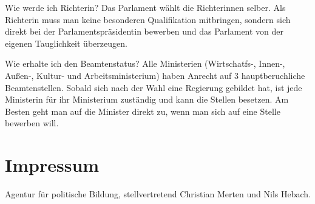 \documentclass{sasbase}
\begin{document}
\begin{question}{Wie werde ich Richterin?}
	Das Parlament w\"{a}hlt die Richterinnen selber. Als Richterin muss man keine besonderen Qualifikation mitbringen, sondern sich direkt bei der Parlamentspr\"{a}sidentin bewerben und das Parlament von der eigenen Tauglichkeit \"{u}berzeugen.
\end{question}

\begin{question}{Wie erhalte ich den Beamtenstatus?}
	Alle Ministerien (Wirtschatfs-, Innen-, Au{\ss}en-, Kultur- und Arbeitsministerium) haben Anrecht auf 3 hauptberuchliche Beamtenstellen. Sobald sich nach der Wahl eine Regierung gebildet hat, ist jede Ministerin f\"{u}r ihr Ministerium zust\"{a}ndig und kann die Stellen besetzen. Am Besten geht man auf die Minister direkt zu, wenn man sich auf eine Stelle bewerben will.
\end{question}


\section{Impressum}
Agentur f\"{u}r politische Bildung, stellvertretend Christian Merten und Nils Hebach.
\end{document}
